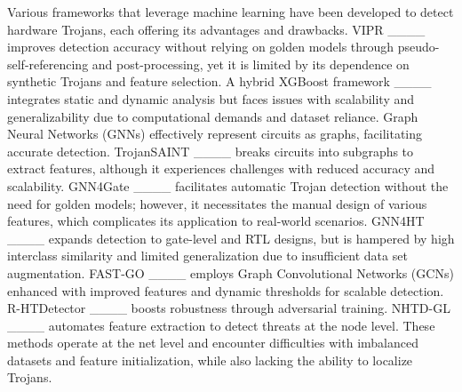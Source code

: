 Various frameworks that leverage machine learning have been developed to detect hardware Trojans, each offering its advantages and drawbacks. VIPR ____ improves detection accuracy without relying on golden models through pseudo-self-referencing and post-processing, yet it is limited by its dependence on synthetic Trojans and feature selection. A hybrid XGBoost framework ____ integrates static and dynamic analysis but faces issues with scalability and generalizability due to computational demands and dataset reliance. Graph Neural Networks (GNNs) effectively represent circuits as graphs, facilitating accurate detection. TrojanSAINT ____ breaks circuits into subgraphs to extract features, although it experiences challenges with reduced accuracy and scalability. GNN4Gate ____ facilitates automatic Trojan detection without the need for golden models; however, it necessitates the manual design of various features, which complicates its application to real-world scenarios. GNN4HT ____ expands detection to gate-level and RTL designs, but is hampered by high interclass similarity and limited generalization due to insufficient data set augmentation. FAST-GO ____ employs Graph Convolutional Networks (GCNs) enhanced with improved features and dynamic thresholds for scalable detection. R-HTDetector ____ boosts robustness through adversarial training. NHTD-GL ____ automates feature extraction to detect threats at the node level. These methods operate at the net level and encounter difficulties with imbalanced datasets and feature initialization, while also lacking the ability to localize Trojans. 



